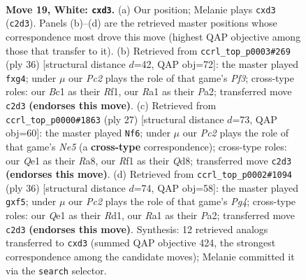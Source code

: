 \documentclass[11pt]{article}
\begin{document}
\begin{figure}[p]
\label{fig:thought-m34}
\end{figure}

\clearpage

\begin{figure}[p]\centering
\begin{subfigure}{0.46\textwidth}\centering
\resizebox{\linewidth}{!}{%
\newchessgame
\chessboard[
  setfen={r1b2rk1/5p2/2p2np1/3qp1Np/p6P/2Pp2P1/P1P2P2/R1B1QRK1 w - - 0 19},
  showmover=false,
  pgfstyle=straightmove, color=movearrow, markmove={c2-d3}
]}
\caption{}
\end{subfigure}\hfill
\begin{subfigure}{0.46\textwidth}\centering
\resizebox{\linewidth}{!}{%
\newchessgame
\chessboard[
  setfen={r4k1r/pp2bp2/1npq4/3p1B1p/3P2p1/2N1PPP1/PPQ3P1/4RRK1 w - - 1 19},
  showmover=false,
  pgfstyle=straightmove, color=movearrow, markmove={f3-g4}
]}
\caption{}
\end{subfigure}
\\[4pt]
\begin{subfigure}{0.46\textwidth}\centering
\resizebox{\linewidth}{!}{%
\newchessgame
\chessboard[
  setfen={r2qkb1r/p4ppp/3p4/3Pp3/1p2n3/2P3P1/1P2NP1P/R1BQ1RK1 b kq - 0 14},
  showmover=false,
  pgfstyle=straightmove, color=movearrow, markmove={e4-f6}
]}
\caption{}
\end{subfigure}\hfill
\begin{subfigure}{0.46\textwidth}\centering
\resizebox{\linewidth}{!}{%
\newchessgame
\chessboard[
  setfen={r1b1r1k1/ppp3p1/2np2qp/5p2/2P2PP1/2Q4P/PP1NP1B1/3RR1K1 w - - 0 19},
  showmover=false,
  pgfstyle=straightmove, color=movearrow, markmove={g4-f5}
]}
\caption{}
\end{subfigure}
\caption{\textbf{Move 19, White: \texttt{cxd3}.} (a) Our position; Melanie plays \texttt{cxd3} (\texttt{c2d3}). Panels (b)--(d) are the retrieved master positions whose correspondence most drove this move (highest QAP objective among those that transfer to it). (b) Retrieved from \texttt{ccrl\_top\_p0003\#269} (ply 36) [structural distance $d$=42, QAP obj=72]: the master played \texttt{fxg4}; under $\mu$ our \emph{Pc2} plays the role of that game's \emph{Pf3}; cross-type roles: our \emph{B}c1 as their \emph{R}f1, our \emph{R}a1 as their \emph{P}a2; transferred move \texttt{c2d3} \textbf{(endorses this move)}. (c) Retrieved from \texttt{ccrl\_top\_p0000\#1863} (ply 27) [structural distance $d$=73, QAP obj=60]: the master played \texttt{Nf6}; under $\mu$ our \emph{Pc2} plays the role of that game's \emph{Ne5} (a \textbf{cross-type} correspondence); cross-type roles: our \emph{Q}e1 as their \emph{R}a8, our \emph{R}f1 as their \emph{Q}d8; transferred move \texttt{c2d3} \textbf{(endorses this move)}. (d) Retrieved from \texttt{ccrl\_top\_p0002\#1094} (ply 36) [structural distance $d$=74, QAP obj=58]: the master played \texttt{gxf5}; under $\mu$ our \emph{Pc2} plays the role of that game's \emph{Pg4}; cross-type roles: our \emph{Q}e1 as their \emph{R}d1, our \emph{R}a1 as their \emph{P}a2; transferred move \texttt{c2d3} \textbf{(endorses this move)}. Synthesis: 12 retrieved analogs transferred to \texttt{cxd3} (summed QAP objective 424, the strongest correspondence among the candidate moves); Melanie committed it via the \texttt{search} selector.}

\end{figure}
\end{document}
